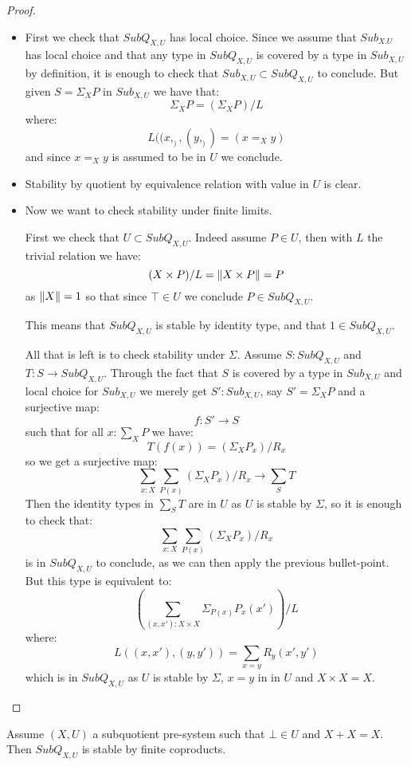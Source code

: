 \begin{proof}
\begin{itemize}
\item First we check that $SubQ_{X,U}$ has local choice. Since we assume that $Sub_{X.U}$ has local choice and that any type in $SubQ_{X,U}$ is covered by a type in $Sub_{X,U}$ by definition, it is enough to check that $Sub_{X,U}\subset SubQ_{X,U}$ to conclude. But given $S = \Sigma_XP$ in $Sub_{X,U}$ we have that:
\[\Sigma_XP = (\Sigma_XP)/L\]
where:
\[L((x,_),(y,_))= (x=_Xy)\]
and since $x=_Xy$ is assumed to be in $U$ we conclude.

\item Stability by quotient by equivalence relation with value in $U$ is clear.

\item Now we want to check stability under finite limits.

First we check that $U\subset SubQ_{X,U}$. Indeed assume $P\in U$, then with $L$ the trivial relation we have:
\[(X\times P) / L = \lVert X\times P \rVert = P\]
as $\lVert X \rVert = 1$ so that since $\top\in U$ we conclude $P\in SubQ_{X,U}$.

This means that $SubQ_{X,U}$ is stable by identity type, and that $1\in SubQ_{X,U}$.

All that is left is to check stability under $\Sigma$. Assume $S: SubQ_{X,U}$ and $T:S\to SubQ_{X,U}$. Through the fact that $S$ is covered by a type in $Sub_{X,U}$ and local choice for $Sub_{X,U}$ we merely get $S':Sub_{X,U}$, say $S'=\Sigma_XP$ and a surjective map:
\[f:S'\to S\]
such that for all $x:\sum_XP$ we have:
\[T(f(x)) = (\Sigma_XP_x)/R_x\]
so we get a surjective map:
\[\sum_{x:X}\sum_{P(x)}(\Sigma_X P_x)/R_x  \to \sum_ST\]
Then the identity types in $\sum_ST$ are in $U$ as $U$ is stable by $\Sigma$, so it is enough to check that:
\[\sum_{x:X}\sum_{P(x)}(\Sigma_X P_x)/R_x\]
is in $SubQ_{X,U}$ to conclude, as we can then apply the previous bullet-point. But this type is equivalent to:
\[\left(\sum_{(x,x'):X\times X}\Sigma_{P(x)}P_x(x')\right)/ L\]
where:
\[L((x,x'),(y,y')) =\sum_{x=y} R_y(x',y') \]
which is in $SubQ_{X,U}$ as $U$ is stable by $\Sigma$, $x=y$ in in $U$ and $X\times X = X$.
\end{itemize}
\end{proof}

\begin{proposition}\label{coproducts-sub-quo}
Assume $(X,U)$ a subquotient pre-system such that $\bot\in U$ and $X+X = X$. Then $SubQ_{X,U}$ is stable by finite coproducts.
\end{proposition}

